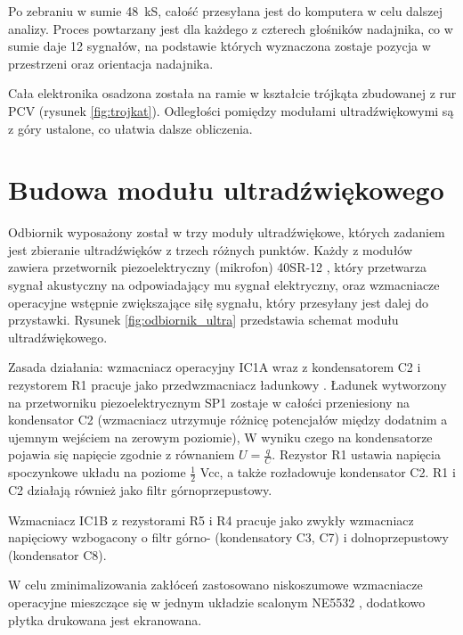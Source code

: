 Po zebraniu w sumie \SI{48}{kS}, całość przesyłana jest do komputera w celu dalszej analizy.
Proces powtarzany jest dla każdego z czterech głośników nadajnika, 
co w sumie daje 12 sygnałów, na podstawie których wyznaczona zostaje 
pozycja w przestrzeni oraz orientacja nadajnika.

Cała elektronika osadzona została na ramie w kształcie trójkąta zbudowanej z rur PCV  (rysunek \ref{fig:trojkat}). 
Odległości pomiędzy modułami ultradźwiękowymi są z góry ustalone, co ułatwia dalsze obliczenia.




\clearpage
\section{Budowa modułu ultradźwiękowego}

Odbiornik wyposażony został w trzy moduły ultradźwiękowe, których zadaniem jest 
zbieranie ultradźwięków z trzech różnych  punktów.
Każdy z modułów zawiera przetwornik piezoelektryczny (mikrofon) 40SR-12 \cite{bib:40ST12},
który przetwarza sygnał akustyczny na odpowiadający mu sygnał elektryczny, oraz wzmacniacze operacyjne 
wstępnie zwiększające siłę sygnału, który przesyłany jest dalej do przystawki.
Rysunek \ref{fig:odbiornik_ultra} przedstawia schemat modułu ultradźwiękowego.


Zasada działania: wzmacniacz operacyjny IC1A wraz z kondensatorem C2 i rezystorem R1 pracuje 
jako przedwzmacniacz ładunkowy \cite{bib:wzm_ladunkowy}.
Ładunek wytworzony na przetworniku piezoelektrycznym SP1 zostaje w całości przeniesiony na kondensator C2 
(wzmacniacz utrzymuje różnicę potencjałów między dodatnim a ujemnym wejściem na zerowym poziomie),
W wyniku czego na kondensatorze pojawia się napięcie zgodnie z równaniem $U=\frac{q}{C}$.
Rezystor R1 ustawia napięcia spoczynkowe układu na poziome $\frac{1}{2}$ Vcc, a także rozładowuje kondensator C2.
R1 i C2 działają również jako filtr górnoprzepustowy.

Wzmacniacz IC1B z rezystorami R5 i R4 pracuje jako zwykły wzmacniacz napięciowy wzbogacony o 
filtr górno- (kondensatory C3, C7) i dolnoprzepustowy 
(kondensator C8).

W celu zminimalizowania zakłóceń zastosowano niskoszumowe wzmacniacze operacyjne
mieszczące się w jednym układzie scalonym NE5532 \cite{bib:ne5532}, 
dodatkowo płytka drukowana jest ekranowana.

